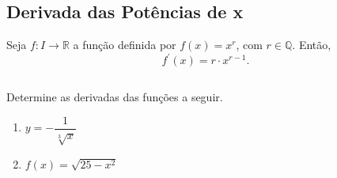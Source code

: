 \subsection{Derivada das Potências de x}
\begin{frame}
  \begin{theorem}
    Seja $f:I\rightarrow\mathbb{R}$ a função definida por $f(x) = x^{r}$, com $r\in\mathbb{Q}$. Então, 
    \begin{equation*}
      f^{\prime}(x) = r\cdot x^{r-1}.
    \end{equation*}
  \end{theorem}
  \begin{columns}[onlytextwidth]
    \begin{column}{0.55\textwidth}
      \begin{example-highlight}
        Determine as derivadas das funções a seguir.
        \begin{enumerate}
          \item $y = -\dfrac{1}{\sqrt[3]{x}}$
          \item $f(x) = \sqrt{25-x^{2}}$
        \end{enumerate}
      \end{example-highlight}
    \end{column}
    \begin{column}{0.43\textwidth}\vspace{-0.6cm}
    \end{column}
  \end{columns}
\end{frame}
